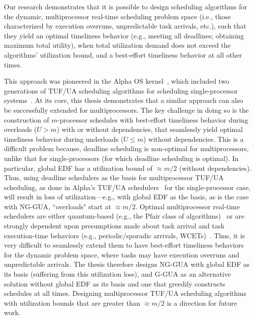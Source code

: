 \documentclass[12pt,dvips]{report}
\begin{document}
Our research demonstrates that it is possible to design scheduling algorithms for the dynamic, multiprocessor real-time scheduling problem space (i.e., those characterized by execution overruns, unpredictable task arrivals, etc.), such that they yield an optimal timeliness behavior (e.g., meeting all deadlines; obtaining maximum total utility), when total utilization demand does not exceed the algorithms' utilization bound, and a best-effort timeliness behavior at all other times.

This approach was pioneered in the Alpha OS kernel~\cite{jn90}, which included two generations of TUF/UA scheduling algorithms for scheduling single-processor systems~\cite{loc86, DASA}. At its core, this thesis demonstrates that a similar approach can also be successfully extended for multiprocessors. The key challenge in doing so is the construction of $m$-processor schedules with best-effort timeliness behavior during overloads ($U > m$) with or without dependencies, that seamlessly yield optimal timeliness behavior during underloads ($U \leq m$) without dependencies. This is a difficult problem because, deadline scheduling is non-optimal for multiprocessors, unlike that for single-processors (for which deadline scheduling is optimal). In particular, global EDF has a utilization bound of $\approx m/2$ (without dependencies). Thus, using deadline schedulers as the basis for multiprocessor TUF/UA scheduling, as done in Alpha's TUF/UA schedulers~\cite{loc86, DASA} for the single-processor case, will result in loss of utilization---e.g., with global EDF as the basis, as is the case with NG-GUA, ``overloads" start at $\approx m/2$. Optimal multiprocessor real-time schedulers are either quantum-based (e.g., the Pfair class of algorithms)~\cite{pfair1} or are strongly dependent upon presumptions made about task arrival and task execution-time behaviors  (e.g., periodic/sporadic arrivals, WCETs)~\cite{cho_llref, chen08, Funaoka08}. Thus, it is very difficult to seamlessly extend them to have best-effort timeliness behaviors for the dynamic problem space, where tasks may have execution overruns and unpredictable arrivals. The thesis therefore designs NG-GUA with global EDF as its basis (suffering from this utilization loss), and G-GUA as an alternative solution without global EDF as its basis and one that greedily constructs schedules at all times. Designing multiprocessor TUF/UA scheduling algorithms with utilization bounds that are greater than $\approx m/2$ is a direction for future work.
\end{document}
